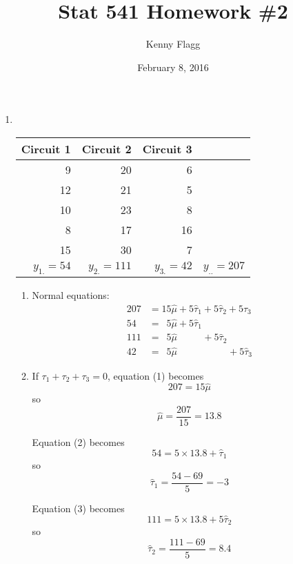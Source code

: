 \documentclass[11pt]{article}
\title{Stat 541 Homework \#2}
\author{Kenny Flagg}
\date{February 8, 2016}
\begin{document}
\maketitle

\begin{enumerate}

\item ~%
\vspace{-22pt}\begin{center}\begin{tabular}{rrrr}
Circuit 1 & Circuit 2 & Circuit 3 & \\
\hline
 9 & 20 &  6 & \\
12 & 21 &  5 & \\
10 & 23 &  8 & \\
 8 & 17 & 16 & \\
15 & 30 &  7 & \\
\hline
\(y_{1.}=54\) & \(y_{2.}=111\) & \(y_{3.}=42\) & \(y_{..}=207\)
\end{tabular}\end{center}
\begin{enumerate}

\item %
Normal equations:
\begin{align}
207&=15\widehat\mu+5\widehat\tau_1+5\widehat\tau_2+5\widehat\tau_3\\
 54&=\:\;5\widehat\mu+5\widehat\tau_1\\
111&=\:\;5\widehat\mu\qquad\:\:\,+5\widehat\tau_2\\
 42&=\:\;5\widehat\mu\qquad\qquad\quad\:+5\widehat\tau_3
\end{align}

\item %
If \(\tau_1+\tau_2+\tau_3=0\), equation (1) becomes
\begin{equation*}
207=15\widehat\mu
\end{equation*}
so
\begin{equation*}
\widehat\mu=\frac{207}{15}=13.8
\end{equation*}

Equation (2) becomes
\begin{equation*}
54=5\times 13.8+\widehat\tau_1
\end{equation*}
so
\begin{equation*}
\widehat\tau_1=\frac{54-69}{5}=-3
\end{equation*}

Equation (3) becomes
\begin{equation*}
111=5\times 13.8+5\widehat\tau_2
\end{equation*}
so
\begin{equation*}
\widehat\tau_2=\frac{111-69}{5}=8.4
\end{equation*}


\end{enumerate}
\end{enumerate}
\end{document}
